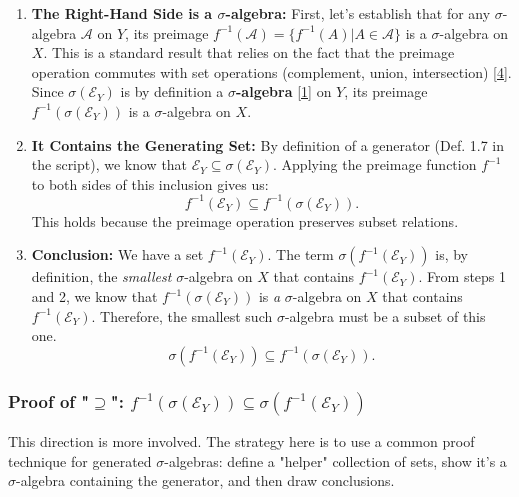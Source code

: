 \documentclass[11pt,a4paper]{article}
\theoremstyle{exercise_style}
\theoremstyle{definition}
\begin{document}
\begin{enumerate}
    \item \textbf{The Right-Hand Side is a $\sigma$-algebra:} First, let's establish that for any $\sigma$-algebra $\mathcal{A}$ on $Y$, its preimage $f^{-1}(\mathcal{A}) = \{f^{-1}(A) | A \in \mathcal{A}\}$ is a $\sigma$-algebra on $X$. This is a standard result that relies on the fact that the preimage operation commutes with set operations (complement, union, intersection) \hyperlink{concept:preimage}{[4]}. Since $\sigma(\mathcal{E}_Y)$ is by definition a \textbf{$\sigma$-algebra} \hyperlink{concept:sigma_algebra}{[1]} on $Y$, its preimage $f^{-1}(\sigma(\mathcal{E}_Y))$ is a $\sigma$-algebra on $X$.

    \item \textbf{It Contains the Generating Set:} By definition of a generator (Def. 1.7 in the script), we know that $\mathcal{E}_Y \subseteq \sigma(\mathcal{E}_Y)$. Applying the preimage function $f^{-1}$ to both sides of this inclusion gives us:
    \[
        f^{-1}(\mathcal{E}_Y) \subseteq f^{-1}(\sigma(\mathcal{E}_Y)).
    \]
    This holds because the preimage operation preserves subset relations.

    \item \textbf{Conclusion:} We have a set $f^{-1}(\mathcal{E}_Y)$. The term $\sigma(f^{-1}(\mathcal{E}_Y))$ is, by definition, the \textit{smallest} $\sigma$-algebra on $X$ that contains $f^{-1}(\mathcal{E}_Y)$.
    From steps 1 and 2, we know that $f^{-1}(\sigma(\mathcal{E}_Y))$ is \textit{a} $\sigma$-algebra on $X$ that contains $f^{-1}(\mathcal{E}_Y)$. Therefore, the smallest such $\sigma$-algebra must be a subset of this one.
    \[
        \sigma(f^{-1}(\mathcal{E}_Y)) \subseteq f^{-1}(\sigma(\mathcal{E}_Y)).
    \]
\end{enumerate}

\subsubsection{Proof of "$\supseteq$": $f^{-1}(\sigma(\mathcal{E}_Y)) \subseteq \sigma(f^{-1}(\mathcal{E}_Y))$}
This direction is more involved. The strategy here is to use a common proof technique for generated $\sigma$-algebras: define a "helper" collection of sets, show it's a $\sigma$-algebra containing the generator, and then draw conclusions.
\end{document}
